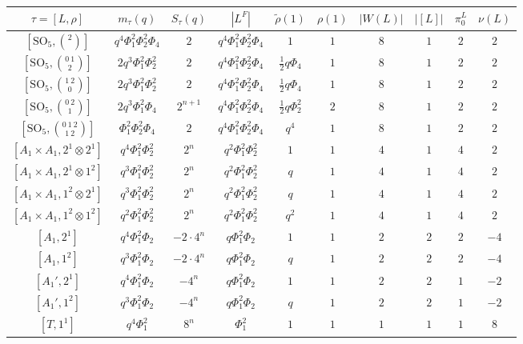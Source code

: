 \documentclass[12pt]{amsart}
\theoremstyle{plain}
\theoremstyle{definition}
\theoremstyle{remark}
\newcommand{\SO}{\mathrm{SO}}
\begin{document}
\begin{figure}[h]
\centering
\begin{tabular}{|c|cc|ccccccc|} 
\hline
$\tau=[L,\rho]$ & $m_\tau(q)$ & $S_\tau(q)$ & $|L^F|$ & $\tilde{\rho}(1)$ & $\rho(1)$ & $|W(L)|$ & $|[L]|$ & $\pi_0^L$ & $\nu(L)$ \\
\hline
$[\SO_5,\binom{2}{}]$ 		& $q^4\Phi_1^2\Phi_2^2\Phi_4$ & $2$ & $q^4\Phi_1^2\Phi_2^2\Phi_4$ & $1$ & $1$ & $8$ & $1$ & $2$ & $2$ \\
$[\SO_5,\binom{0\ 1}{2}]$ 		& $2q^3\Phi_1^2\Phi_2^2$ & $2$ & $q^4\Phi_1^2\Phi_2^2\Phi_4$ & $\frac{1}{2}q\Phi_4$ & $1$ & $8$ & $1$ & $2$ & $2$ \\
$[\SO_5,\binom{1\ 2}{0}]$ 		& $2q^3\Phi_1^2\Phi_2^2$ & $2$ & $q^4\Phi_1^2\Phi_2^2\Phi_4$ & $\frac{1}{2}q\Phi_4$ & $1$ & $8$ & $1$ & $2$ & $2$ \\
$[\SO_5,\binom{0\ 2}{1}]$ 		& $2q^3\Phi_1^2\Phi_4$ & $2^{n+1}$ & $q^4\Phi_1^2\Phi_2^2\Phi_4$ & $\frac{1}{2}q\Phi_2^2$ & $2$ & $8$ & $1$ & $2$ & $2$ \\
$[\SO_5,\binom{0\ 1\ 2}{1\ 2}]$ 	& $\Phi_1^2\Phi_2^2\Phi_4$ & $2$ & $q^4\Phi_1^2\Phi_2^2\Phi_4$ & $q^4$ & $1$ & $8$ & $1$ & $2$ & $2$ \\
$[{A_1\times A_1},2^1\otimes2^1]$ 	& $ q^4\Phi_1^2\Phi_2^2$ & $2^n$ & $q^2\Phi_1^2\Phi_2^2$ & $1$ & $1$ & $4$ & $1$ & $4$ & $2$ \\
$[{A_1\times A_1},2^1\otimes1^2]$ 	& $q^3\Phi_1^2\Phi_2^2$ & $2^n$ & $q^2\Phi_1^2\Phi_2^2$ & $q$ & $1$ & $4$ & $1$ & $4$ & $2$ \\
$[{A_1\times A_1},1^2\otimes2^1]$ 	& $q^3\Phi_1^2\Phi_2^2$ & $2^n$ & $q^2\Phi_1^2\Phi_2^2$ & $q$ & $1$ & $4$ & $1$ & $4$ & $2$ \\
$[{A_1\times A_1},1^2\otimes1^2]$ 	& $q^2\Phi_1^2\Phi_2^2$ & $2^n$ & $q^2\Phi_1^2\Phi_2^2$ & $q^2$ & $1$ & $4$ & $1$ & $4$ & $2$ \\
$[{A_1},2^1]$ & $q^4\Phi_1^2\Phi_2$ & $-2\cdot 4^n$ & $q\Phi_1^2\Phi_2$ 	& $1$ & $1$ & $2$ & $2$ & $2$ & $-4$ \\
$[{A_1},1^2]$ & $q^3\Phi_1^2\Phi_2$ & $-2\cdot 4^n$ & $q\Phi_1^2\Phi_2$ 	& $q$ & $1$ & $2$ & $2$ & $2$ & $-4$ \\
$[{A_1'},2^1]$ & $q^4\Phi_1^2\Phi_2$ & $-4^{n}$ & $q\Phi_1^2\Phi_2$ & $1$ & $1$ & $2$ & $2$ & $1$ & $-2$ \\
$[{A_1'},1^2]$ & $q^3\Phi_1^2\Phi_2$ & $-4^{n}$ & $q\Phi_1^2\Phi_2$ & $q$ & $1$ & $2$ & $2$ & $1$ & $-2$ \\
$[T,1^1]$ & $q^4\Phi_1^2$ & $8^n$ & $\Phi_1^2$ & $1$ & $1$ & $1$ & $1$ & $1$ & $8$ \\
\hline
\end{tabular}
\end{figure}
\end{document}
